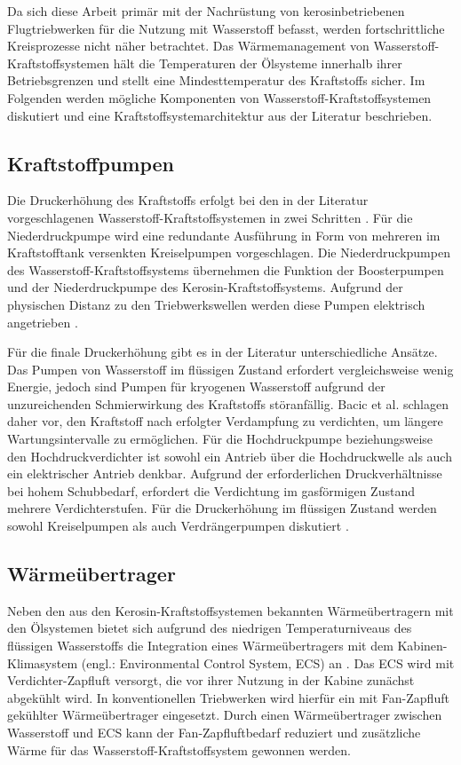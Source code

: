 Da sich diese Arbeit primär mit der Nachrüstung von kerosinbetriebenen Flugtriebwerken für die Nutzung mit Wasserstoff befasst, werden fortschrittliche Kreisprozesse nicht näher betrachtet. Das Wärmemanagement von Wasserstoff-Kraftstoffsystemen hält die Temperaturen der Ölsysteme innerhalb ihrer Betriebsgrenzen und stellt eine Mindesttemperatur des Kraftstoffs sicher. Im Folgenden werden mögliche Komponenten von Wasserstoff-Kraftstoffsystemen diskutiert und eine Kraftstoffsystemarchitektur aus der Literatur beschrieben.

\subsection{Kraftstoffpumpen}

Die Druckerhöhung des Kraftstoffs erfolgt bei den in der Literatur vorgeschlagenen Wasserstoff-Kraftstoffsystemen in zwei Schritten \cite{Ebrahimi.2024}. Für die Niederdruckpumpe wird eine redundante Ausführung in Form von mehreren im Kraftstofftank versenkten Kreiselpumpen vorgeschlagen. Die Niederdruckpumpen des Wasserstoff-Kraftstoffsystems übernehmen die Funktion der Boosterpumpen und der Niederdruckpumpe des Kerosin-Kraftstoffsystems. Aufgrund der physischen Distanz zu den Triebwerkswellen werden diese Pumpen elektrisch angetrieben \cite{Scholz.2003}. 

Für die finale Druckerhöhung gibt es in der Literatur unterschiedliche Ansätze. Das Pumpen von Wasserstoff im flüssigen Zustand erfordert vergleichsweise wenig Energie, jedoch sind Pumpen für kryogenen Wasserstoff aufgrund der unzureichenden Schmierwirkung des Kraftstoffs störanfällig. Bacic et al. \cite{BacicMarkoCoullJohn.2024} schlagen daher vor, den Kraftstoff nach erfolgter Verdampfung zu verdichten, um längere Wartungsintervalle zu ermöglichen. Für die Hochdruckpumpe beziehungsweise den Hochdruckverdichter ist sowohl ein Antrieb über die Hochdruckwelle als auch ein elektrischer Antrieb denkbar. Aufgrund der erforderlichen Druckverhältnisse bei hohem Schubbedarf, erfordert die Verdichtung im gasförmigen Zustand mehrere Verdichterstufen. Für die Druckerhöhung im flüssigen Zustand werden sowohl Kreiselpumpen als auch Verdrängerpumpen diskutiert \cite{Scholz.2003, Shaffer.2014}.

\subsection{Wärmeübertrager}

Neben den aus den Kerosin-Kraftstoffsystemen bekannten Wärmeübertragern mit den Ölsystemen bietet sich aufgrund des niedrigen Temperaturniveaus des flüssigen Wasserstoffs die Integration eines Wärmeübertragers mit dem Kabinen-Klimasystem (engl.: Environmental Control System, ECS) an \cite{Brewer.1991}. Das ECS wird mit Verdichter-Zapfluft versorgt, die vor ihrer Nutzung in der Kabine zunächst abgekühlt wird. In konventionellen Triebwerken wird hierfür ein mit Fan-Zapfluft gekühlter Wärmeübertrager eingesetzt. Durch einen Wärmeübertrager zwischen Wasserstoff und ECS kann der Fan-Zapfluftbedarf reduziert und zusätzliche Wärme für das Wasserstoff-Kraftstoffsystem gewonnen werden. 

